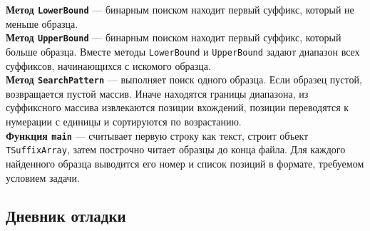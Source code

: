 \documentclass[12pt]{article}
\begin{document}
\textbf{Метод \texttt{LowerBound}} — бинарным поиском находит первый суффикс, который не меньше образца. \\

\textbf{Метод \texttt{UpperBound}} — бинарным поиском находит первый суффикс, который больше образца. Вместе методы \texttt{LowerBound} и \texttt{UpperBound} задают диапазон всех суффиксов, начинающихся с искомого образца. \\

\textbf{Метод \texttt{SearchPattern}} — выполняет поиск одного образца. Если образец пустой, возвращается пустой массив. Иначе находятся границы диапазона, из суффиксного массива извлекаются позиции вхождений, позиции переводятся к нумерации с единицы и сортируются по возрастанию. \\

\textbf{Функция \texttt{main}} — считывает первую строку как текст, строит объект \texttt{TSuffixArray}, затем построчно читает образцы до конца файла. Для каждого найденного образца выводится его номер и список позиций в формате, требуемом условием задачи. \\

\subsection*{Дневник отладки}
\end{document}
